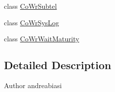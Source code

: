 \begin{DoxyCompactItemize}
\item 
class \hyperlink{classit_1_1polito_1_1elite_1_1enocean_1_1protocol_1_1serial_1_1v3_1_1network_1_1packet_1_1commoncommand_1_1_co_wr_subtel}{Co\+Wr\+Subtel}
\item 
class \hyperlink{classit_1_1polito_1_1elite_1_1enocean_1_1protocol_1_1serial_1_1v3_1_1network_1_1packet_1_1commoncommand_1_1_co_wr_sys_log}{Co\+Wr\+Sys\+Log}
\item 
class \hyperlink{classit_1_1polito_1_1elite_1_1enocean_1_1protocol_1_1serial_1_1v3_1_1network_1_1packet_1_1commoncommand_1_1_co_wr_wait_maturity}{Co\+Wr\+Wait\+Maturity}
\end{DoxyCompactItemize}


\subsection{Detailed Description}
\begin{DoxyAuthor}{Author}
andreabiasi 
\end{DoxyAuthor}
